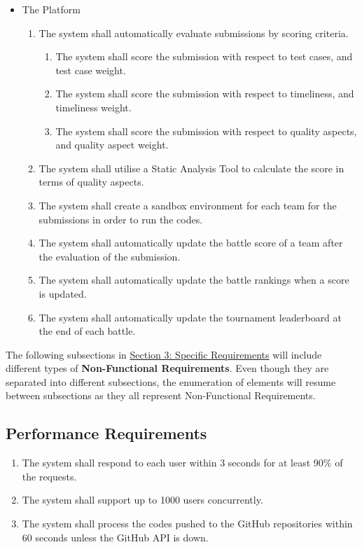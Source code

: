 \begin{itemize}
 \item The Platform
  \begin{enumerate}[resume]
     \item The system shall automatically evaluate submissions by scoring criteria.
     \begin{enumerate}
         \item The system shall score the submission with respect to test cases, and test case weight.
         \item The system shall score the submission with respect to timeliness, and timeliness weight.
         \item The system shall score the submission with respect to quality aspects, and quality aspect weight.
     \end{enumerate}
     \item The system shall utilise a Static Analysis Tool to calculate the score in terms of quality aspects.
     \item The system shall create a sandbox environment for each team for the submissions in order to run the codes.
     \item The system shall automatically update the battle score of a team after the evaluation of the submission.
     \item The system shall automatically update the battle rankings when a score is updated.
     \item The system shall automatically update the tournament leaderboard at the end of each battle.
 \end{enumerate}
 
\end{itemize}


\vspace{3mm}

\noindent The following subsections in \hyperref[sect:requirements]{Section 3: Specific Requirements} will include different types of \textbf{Non-Functional Requirements}. Even though they are separated into different subsections, the enumeration of elements will resume between subsections as they all represent Non-Functional Requirements.



\subsection{Performance Requirements}
\begin{enumerate}
    \item The system shall respond to each user within 3 seconds for at least 90\% of the requests.
    \item The system shall support up to 1000 users concurrently.
    \item The system shall process the codes pushed to the GitHub repositories within 60 seconds unless the GitHub API is down.
\end{enumerate}
    


